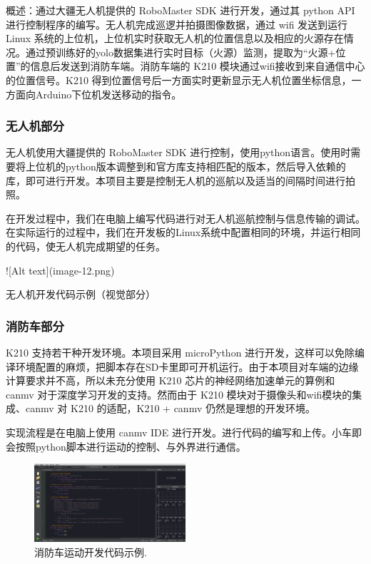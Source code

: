 \documentclass[12pt, a4paper, oneside]{article}
\begin{document}
概述：通过大疆无人机提供的 RoboMaster SDK 进行开发，通过其 python API 进行控制程序的编写。无人机完成巡逻并拍摄图像数据，通过 wifi 发送到运行 Linux 系统的上位机，上位机实时获取无人机的位置信息以及相应的火源存在情况。通过预训练好的yolo数据集进行实时目标（火源）监测，提取为“火源+位置”的信息后发送到消防车端。消防车端的 K210 模块通过wifi接收到来自通信中心的位置信号。K210 得到位置信号后一方面实时更新显示无人机位置坐标信息，一方面向Arduino下位机发送移动的指令。

\subsubsection{无人机部分}

无人机使用大疆提供的 RoboMaster SDK 进行控制，使用python语言。使用时需要将上位机的python版本调整到和官方库支持相匹配的版本，然后导入依赖的库，即可进行开发。本项目主要是控制无人机的巡航以及适当的间隔时间进行拍照。

在开发过程中，我们在电脑上编写代码进行对无人机巡航控制与信息传输的调试。在实际运行的过程中，我们在开发板的Linux系统中配置相同的环境，并运行相同的代码，使无人机完成期望的任务。

![Alt text](image-12.png)

无人机开发代码示例（视觉部分）

\subsubsection{消防车部分}


K210 支持若干种开发环境。本项目采用 microPython 进行开发，这样可以免除编译环境配置的麻烦，把脚本存在SD卡里即可开机运行。由于本项目对车端的边缘计算要求并不高，所以未充分使用 K210 芯片的神经网络加速单元的算例和 canmv 对于深度学习开发的支持。然而由于 K210 模块对于摄像头和wifi模块的集成、canmv 对 K210 的适配，K210 + canmv 仍然是理想的开发环境。

实现流程是在电脑上使用 canmv IDE 进行开发。进行代码的编写和上传。小车即会按照python脚本进行运动的控制、与外界进行通信。

\begin{figure}[H]
    \centering
    \includegraphics[width=0.5\textwidth]{872c699ad55fe13ea9324a12a8a9b0d.png}
    \caption{消防车运动开发代码示例.}
    \label{消防车运动开发代码示例}
\end{figure}
\end{document}
